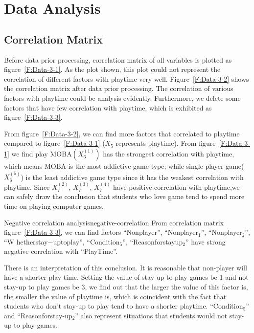 \documentclass[scheme=plain]{ctexart}
\begin{document}
\section{Data Analysis}
\subsection{Correlation Matrix}
Before data prior processing, correlation matrix of all variables is plotted as figure~\ref{F:Data-3-1}. As the plot shown, this plot could not represent the correlation of different factors with playtime very well. Figure~\ref{F:Data-3-2} shows the correlation matrix after data prior processing. The correlation of various factors with playtime could be analysis evidently. Furthermore, we delete some factors that have few correlation
with playtime, which is exhibited as figure~\ref{F:Data-3-3}.

From figure~\ref{F:Data-3-2}, we can find more factors that correlated to playtime compared to figure~\ref{F:Data-3-1} ($X_5$
represents playtime). From figure~\ref{F:Data-3-1} we find play $\mathrm{MOBA}(X_6^{(1)})$ has the strongest correlation with
playtime, which means $\mathrm{MOBA}$ is the most addictive game type; while single-player game($X_6^{(5)}$) is the least addictive game type since it has the weakest correlation with playtime. Since $X_7^{(2)}$, $X_7^{(3)}$, $X_7^{(4)}$ have positive correlation with playtime,we can safely draw the conclusion that students who love game tend to spend more time on playing computer games.

\begin{analysis}{Negative correlation analysis}{negative-correlation}
From correlation matrix figure~\ref{F:Data-3-3}, we can find factors ``Nonplayer'', ``Nonplayer$_1$'', ``Nonplayer$_2$'', ``W hetherstay−uptoplay'', ``Condition$_5$'', ``Reasonforstayup$_2$'' have strong negative correlation with ``PlayTime''.
\end{analysis}

There is an interpretation of this conclusion. It is reasonable that non-player will have a shorter play time. Setting the value of stay-up to play games be 1 and not stay-up to play games be 3, we find out that the larger the value of this factor is, the smaller the value of playtime is, which is coincident with the fact that students who don't stay-up to play tend to have a shorter playtime. ``Condition$_5$'' and ``Reasonforstay-up$_2$'' also represent situations that students would not stay-up to play games.
\end{document}
